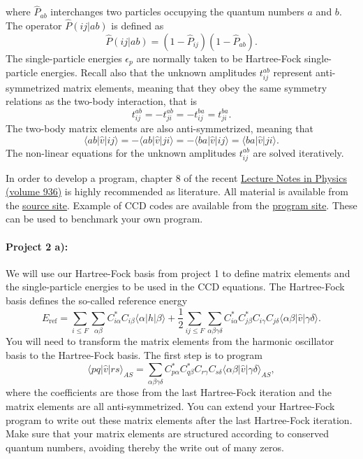 \documentclass[%
oneside,                 %
final,                   %
10pt]{article}
\begin{document}
  where $\hat{P}_{ab}$ interchanges two particles occupying the
  quantum numbers $a$ and $b$.  The operator $\hat{P}(ij\vert ab)$ is
  defined as
  \[
  \hat{P}(ij\vert ab) = (1-\hat{P}_{ij})(1-\hat{P}_{ab}).
  \]
  The single-particle energies $\epsilon_p$ are normally taken to be Hartree-Fock single-particle energies.
  Recall also that the unknown amplitudes $t_{ij}^{ab}$ represent
  anti-symmetrized matrix elements, meaning that they obey the same
  symmetry relations as the two-body interaction, that is
  \[
  t_{ij}^{ab}=-t_{ji}^{ab}=-t_{ij}^{ba}=t_{ji}^{ba}.
  \]
  The two-body matrix elements are also anti-symmetrized, meaning that
  \[
  \langle ab \vert \hat{v} \vert ij \rangle = -\langle ab \vert
  \hat{v} \vert ji \rangle= -\langle ba \vert \hat{v} \vert ij
  \rangle=\langle ba \vert \hat{v} \vert ji \rangle.
  \]
  The non-linear equations for the unknown amplitudes $t_{ij}^{ab}$
  are solved iteratively.

In order to develop a program, chapter 8 of the recent \href{{http://www.springer.com/us/book/9783319533353}}{Lecture Notes in Physics (volume 936)} is highly recommended as literature.
All material is available from the \href{{https://github.com/ManyBodyPhysics/LectureNotesPhysics/blob/master/doc/src/lnp.pdf}}{source site}. Example of CCD codes are available from the \href{{https://github.com/ManyBodyPhysics/LectureNotesPhysics/tree/master/Programs/Chapter8-programs/cpp/CCD}}{program site}. These can be used to benchmark your own program.

\paragraph{Project 2 a):}
We will use our Hartree-Fock basis from project 1 to define matrix elements and the single-particle energies to be used in the CCD equations. The Hartree-Fock basis defines the so-called reference energy
\begin{equation}
  E_{\mathrm{ref}} = \sum_{i\le F} \sum_{\alpha\beta}
  C^*_{i\alpha}C_{i\beta}\langle \alpha | h | \beta \rangle +
  \frac{1}{2}\sum_{ij\le F}\sum_{{\alpha\beta\gamma\delta}}
  C^*_{i\alpha}C^*_{j\beta}C_{i\gamma}C_{j\delta}\langle
  \alpha\beta|\hat{v}|\gamma\delta\rangle.
\end{equation}
You will need to transform the matrix elements from the harmonic oscillator basis to the Hartree-Fock basis.
The first step is to program
\begin{equation}
  \langle pq \vert \hat{v} \vert rs\rangle_{AS}=
  \sum_{{\alpha\beta\gamma\delta}}
  C^*_{p\alpha}C^*_{q\beta}C_{r\gamma}C_{s\delta}\langle
  \alpha\beta|\hat{v}|\gamma\delta\rangle_{AS},
\end{equation}
where the coefficients are those from the last Hartree-Fock iteration and the matrix elements are all anti-symmetrized.
You can extend your Hartree-Fock program to write out these matrix elements after the last Hartree-Fock iteration.
Make sure that your matrix elements are structured according to conserved quantum numbers, avoiding thereby the write out of many zeros.
\end{document}
